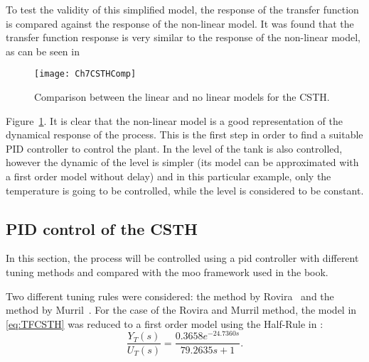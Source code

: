 To test the validity of this simplified model, the response of the transfer function is compared against the response of the non-linear model. It was found that the transfer function response is very similar to the response of the non-linear model, as can be seen in %
%
\begin{figure}[tb]
	\centering
	\texttt{[image: Ch7CSTHComp]}
	\caption{Comparison between the linear and no linear models for the CSTH.}
	\label{fig:Ch7CSTHComp}
\end{figure}
%
Figure~\ref{fig:Ch7CSTHComp}. It is clear that the non-linear model is a good representation of the dynamical response of the process. This is the first step in order to find a suitable PID controller to control the plant. In \cite{Alfaro2016} the level of the tank is also controlled, however the dynamic of the level is simpler (its model can be approximated with a first order model without delay) and in this particular example, only the temperature is going to be controlled, while the level is considered to be constant.
%
\subsection{PID control of the CSTH}
\label{sec:PIDCSTH}
In this section, the process will be controlled using a \gls{pid} controller with different tuning methods and compared with the \gls{moo} framework used in the book.

Two different tuning rules were considered: the method by Rovira~\cite{Rovira1969a} and the method by Murril~\cite{Murril1967}. For the case of the Rovira and Murril method, the model in \eqref{eq:TFCSTH} was reduced to a first order model using the Half-Rule in \cite{Skogestad2003}:
\begin{equation}
\frac{Y_T(s)}{U_T(s)} = \frac{0.3658 e^{-24.7360 s}}{79.2635 s +1}.
\label{eq:TFCSTHFirstOrder}
\end{equation}

